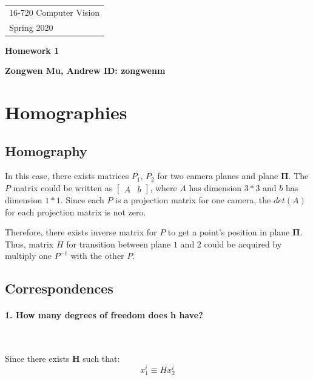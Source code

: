 \documentclass[11pt]{article} \usepackage{fullpage} \usepackage{graphicx} \usepackage{epstopdf} \usepackage{color} \usepackage{psfrag} \usepackage{pdfsync}\usepackage{indentfirst}\usepackage{subfigure}\usepackage{float}\usepackage[section]{placeins}
\begin{document}
{\parindent 0pt \begin{tabular}[t]{l} 16-720 Computer Vision \\ Spring 2020 \end{tabular}}%
\parindent 0pt \parskip 8pt
\begin{center} \large\bf Homework 1 \end{center}
\begin{center} \large\bf Zongwen Mu, Andrew ID: zongwenm \end{center}
\bigskip


\section{Homographies}

\setcounter{subsection}{0}
\subsection{Homography}

\setlength{\parindent}{2em}  In this case, there exists matrices $P_1$, $P_2$ for two camera planes and plane $\boldsymbol{\Pi}$. The $P$ matrix could be written as $\left[ \begin{smallmatrix} A & b  \end{smallmatrix} \right]$, where $A$ has dimension $3*3$ and $b$ has dimension $1*1$. Since each $P$ is a projection matrix for one camera, the $det\left(A\right)$ for each projection matrix is not zero.

Therefore, there exists inverse matrix for $P$ to get a point's position in plane $\boldsymbol{\Pi}$. Thus, matrix $H$ for transition between plane $1$ and $2$ could be acquired by multiply one $P^{-1}$ with the other $P$.

\subsection{Correspondences}

\paragraph{1. How many degrees of freedom does h have?}~{}

Since there exists $\boldsymbol{H}$ such that:
\begin{equation}
	x_1^i \equiv Hx_2^i
\end{equation}
\end{document}

